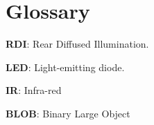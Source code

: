 \chapter{Glossary}\label{gloss}

\textbf{RDI}: Rear Diffused Illumination.

\textbf{LED}: Light-emitting diode.

\textbf{IR}: Infra-red

\textbf{BLOB}: Binary Large Object 